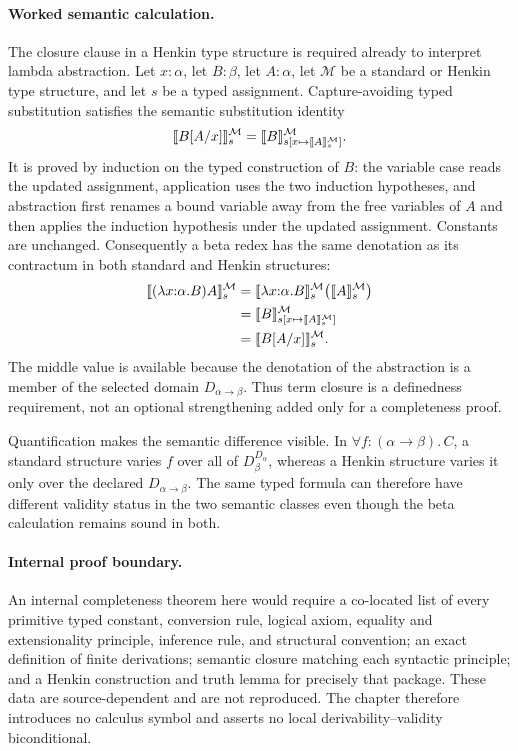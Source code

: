 \documentclass[11pt,oneside,openany]{book}
\theoremstyle{definition}
\theoremstyle{plain}
\theoremstyle{remark}
\DeclarePairedDelimiter{\sem}{\llbracket}{\rrbracket}
\begin{document}
\paragraph{Worked semantic calculation.}
The closure clause in a Henkin type structure is required already to interpret
lambda abstraction.  Let \(x{:}\alpha\), let \(B{:}\beta\), let
\(A{:}\alpha\), let \(\mathcal M\) be a standard or Henkin type structure,
and let \(s\) be a typed assignment.  Capture-avoiding typed substitution
satisfies the semantic substitution identity
\[
  \sem{B[A/x]}^{\mathcal M}_s
  =
  \sem{B}^{\mathcal M}_{
    s[x\mapsto\sem{A}^{\mathcal M}_s]}.
\]
It is proved by induction on the typed construction of \(B\): the variable
case reads the updated assignment, application uses the two induction
hypotheses, and abstraction first renames a bound variable away from the free
variables of \(A\) and then applies the induction hypothesis under the updated
assignment.  Constants are unchanged.  Consequently a beta redex has the same
denotation as its contractum in both standard and Henkin structures:
\[
\begin{aligned}
  \sem{(\lambda x{:}\alpha.B)A}^{\mathcal M}_s
    &=\sem{\lambda x{:}\alpha.B}^{\mathcal M}_s
       \bigl(\sem{A}^{\mathcal M}_s\bigr)\\
    &=\sem{B}^{\mathcal M}_{
       s[x\mapsto\sem{A}^{\mathcal M}_s]}\\
    &=\sem{B[A/x]}^{\mathcal M}_s.
\end{aligned}
\]
The middle value is available because the denotation of the abstraction is a
member of the selected domain \(D_{\alpha\to\beta}\).  Thus term closure is a
definedness requirement, not an optional strengthening added only for a
completeness proof.

Quantification makes the semantic difference visible.  In
\(\forall f{:}(\alpha\to\beta).\,C\), a standard structure varies \(f\) over
all of \(D_\beta^{D_\alpha}\), whereas a Henkin structure varies it only over
the declared \(D_{\alpha\to\beta}\).  The same typed formula can therefore
have different validity status in the two semantic classes even though the
beta calculation remains sound in both.

\paragraph{Internal proof boundary.}
An internal completeness theorem here would require a co-located list of every
primitive typed constant, conversion rule, logical axiom, equality and
extensionality principle, inference rule, and structural convention; an exact
definition of finite derivations; semantic closure matching each syntactic
principle; and a Henkin construction and truth lemma for precisely that
package.  These data are source-dependent and are not reproduced.  The chapter
therefore introduces no calculus symbol and asserts no local
derivability--validity biconditional.
\end{document}
